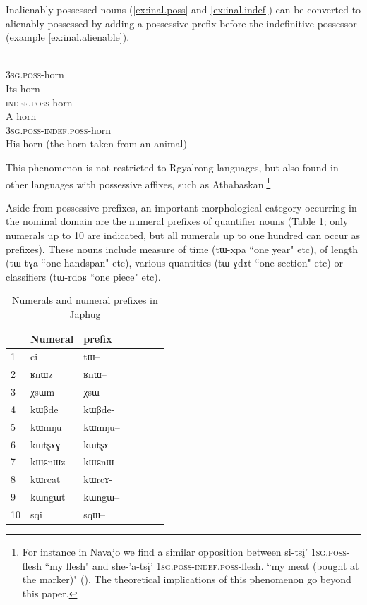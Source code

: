 \documentclass[oldfontcommands,oneside,a4paper,11pt]{article}
\newcommand{\ipa}[1]{{\phon \mbox{#1}}} %
\begin{document}
Inalienably possessed nouns (\ref{ex:inal.poss} and \ref{ex:inal.indef}) can be converted to alienably possessed by adding a possessive prefix before the indefinitive possessor (example \ref{ex:inal.alienable}).

\begin{exe}
\ex \label{ex:inal.poss}
\gll \ipa{ɯ-ʁrɯ} \\
3\textsc{sg.poss}-horn \\
\glt Its horn
\ex \label{ex:inal.indef}
\gll \ipa{ta-ʁrɯ} \\
\textsc{indef.poss}-horn \\
\glt A horn
\ex \label{ex:inal.alienable}
\gll \ipa{ɯ-ta-ʁrɯ} \\
3\textsc{sg.poss}-\textsc{indef.poss}-horn \\
\glt His horn (the horn taken from an animal)
\end{exe}
            
This phenomenon is not restricted to Rgyalrong languages, but also found in other languages with possessive affixes, such as Athabaskan.\footnote{For instance in Navajo we find a similar opposition between  \ipa{si-tsį'} \textsc{1sg.poss}-flesh ``my flesh" and \ipa{she-'a-tsį'} \textsc{1sg.poss}-\textsc{indef.poss}-flesh. ``my meat (bought at the marker)" (\citealt[10]{ym87navajo}). The theoretical implications of this phenomenon go beyond this paper.}       
            
Aside from possessive prefixes, an important morphological category occurring in the nominal domain are the numeral prefixes of quantifier nouns (Table \ref{tab:numeral}; only numerals up to 10 are indicated, but all numerals up to one hundred can occur as prefixes). These nouns include measure of time (\ipa{tɯ-xpa} ``one year" etc), of length (\ipa{tɯ-tɣa} ``one handspan" etc), various quantities (\ipa{tɯ-ɣdɤt} ``one section" etc) or classifiers (\ipa{tɯ-rdoʁ} ``one piece" etc). 


\begin{table}[H]
\caption{Numerals and numeral prefixes in Japhug} \label{tab:numeral}  \centering
\begin{tabular}{lllllll}
\toprule
&Numeral & prefix \\
\midrule
1 &\ipa{ci} &\ipa{tɯ--} \\
2 &\ipa{ʁnɯz} &\ipa{ʁnɯ--} \\
3 &\ipa{χsɯm} &\ipa{χsɯ--} \\
4 &\ipa{kɯβde} &\ipa{kɯβde-} \\
5 &\ipa{kɯmŋu} &\ipa{kɯmŋu--} \\
6 &\ipa{kɯtʂɤɣ-} &\ipa{kɯtʂɤ--} \\
7 &\ipa{kɯɕnɯz} &\ipa{kɯɕnɯ--} \\
8 &\ipa{kɯrcat} &\ipa{kɯrcɤ-} \\
9 &\ipa{kɯngɯt} &\ipa{kɯngɯ--} \\
10 &\ipa{sqi} &\ipa{sqɯ--} \\
\bottomrule
\end{tabular}
\end{table}
\end{document}
